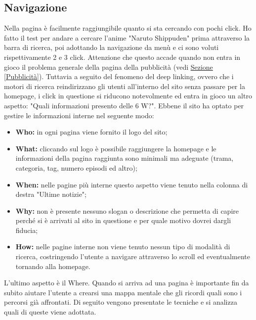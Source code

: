\subsection{Navigazione} \label{Navigazione}
Nella pagina è facilmente raggiungibile quanto si sta cercando con pochi click. Ho fatto il test per andare a cercare l'anime "Naruto Shippuden" prima attraverso la barra di ricerca, poi adottando la navigazione da menù e ci sono voluti rispettivamente 2 e 3 click. Attenzione che questo accade quando non entra in gioco il problema generale della pagina della pubblicità (vedi \hyperref[Pubblicità]{Sezione \ref{Pubblicità}}).
Tuttavia a seguito del fenomeno del deep linking, ovvero che i motori di ricerca reindirizzano gli utenti all'interno del sito senza passare per la homepage, i click in questione si riducono notevolmente ed entra in gioco un altro aspetto: "Quali informazioni presento delle 6 W?".
Ebbene il sito ha optato per gestire le informazioni interne nel seguente modo:
\begin{itemize}
	\item \textbf{Who:} in ogni pagina viene fornito il logo del sito;
	\item \textbf{What:} cliccando sul logo è possibile raggiungere la homepage e le informazioni della pagina raggiunta sono minimali ma adeguate (trama, categoria, tag, numero episodi ed altro);
	\item \textbf{When:} nelle pagine più interne questo aspetto viene tenuto nella colonna di destra "Ultime notizie";
	\item \textbf{Why:} non è presente nessuno slogan o descrizione che permetta di capire perché si è arrivati al sito in questione e per quale motivo dovrei dargli fiducia;
	\item \textbf{How:} nelle pagine interne non viene tenuto nessun tipo di modalità di ricerca, costringendo l'utente a navigare attraverso lo scroll ed eventualmente tornando alla homepage. 
\end{itemize}
L'ultimo aspetto è il Where. Quando si arriva ad una pagina è importante fin da subito aiutare l'utente a crearsi una mappa mentale che gli ricordi quali sono i percorsi già affrontati. Di seguito vengono presentate le tecniche e si analizza quali di queste viene adottata.

\newpage

